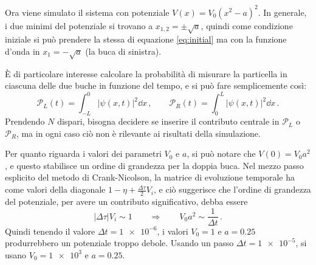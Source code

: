 \documentclass[a4paper, titlepage]{article}
\numberwithin{equation}{section}
\begin{document}
Ora viene simulato il sistema con potenziale $V(x) = V_0(x^2-a)^2$. In generale, i due minimi del potenziale si trovano a $x_{1,2} = \pm \sqrt{a}$, quindi come condizione iniziale si può prendere la stessa di equazione \eqref{eq:initial} ma con la funzione d'onda in $x_1 = -\sqrt{a}$ (la buca di sinistra). 

È di particolare interesse calcolare la probabilità di misurare la particella in ciascuna delle due buche in funzione del tempo, e si può fare semplicemente così:
\[
    \mathcal{P}_L(t) = \int_{-L}^0 |\psi(x,t)|^2 \dd x\, ,
    \qquad
    \mathcal{P}_R(t) = \int_0^L |\psi(x,t)|^2 \dd x\, .
\]
Prendendo $N$ dispari, bisogna decidere se inserire il contributo centrale in $\mathcal{P}_L$ o  $\mathcal{P}_R$, ma in ogni caso ciò non è rilevante ai risultati della simulazione. 

Per quanto riguarda i valori dei parametri $V_0$ e $a$, si può notare che $V(0) = V_0 a^2$, e questo stabilisce un ordine di grandezza per la doppia buca. Nel mezzo passo esplicito del metodo di Crank-Nicolson, la matrice di evoluzione temporale ha come valori della diagonale $1-\eta + \frac{\Delta\tau}{2} V_i$, e ciò suggerisce che l'ordine di grandezza del potenziale, per avere un contributo significativo, debba essere
\[
    |\Delta\tau| V_i \sim 1 
    \qquad \Rightarrow \qquad
    V_0 a^2 \sim \frac{1}{\Delta t}\, .
\]
Quindi tenendo il valore $\Delta t = \num{1e-6}$, i valori $V_0 = 1$ e $a = 0.25$ produrrebbero un potenziale troppo debole. Usando un passo $\Delta t = \num{1e-5}$, si usano $V_0 = \num{1e3}$ e $a = 0.25$.













\appendix
\end{document}
